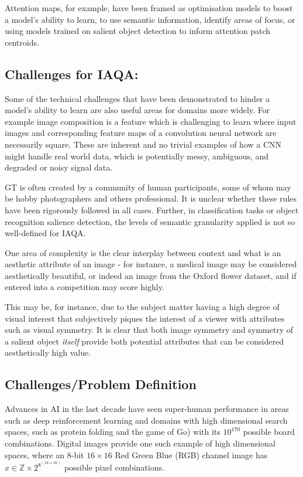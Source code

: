 \par Attention maps, for example, have been framed as optimisation models to boost a model's ability to learn, to use semantic information, identify areas of focus, or using models trained on salient object detection to inform attention patch centroids.

\subsection{Challenges for IAQA:}

Some of the technical challenges that have been demonstrated to hinder a model's ability to learn are also useful areas for domains more widely. For example image composition is a feature which is challenging to learn where input images and corresponding feature maps of a convolution neural network are necessarily square. These are inherent and no trivial examples of how a CNN might handle real world data, which is potentially messy, ambiguous, and degraded or noisy signal data.


GT is often created by a community of human participants, some of whom may be hobby photographers and others professional. It is unclear whether these rules have been rigorously followed in all cases. Further, in classification tasks or object recognition salience detection, the levels of semantic granularity applied is not so well-defined for IAQA. 

One area of complexity is the clear interplay between context and what is an aesthetic attribute of an image - for instance, a medical image may be considered aesthetically beautiful, or indeed an image from the Oxford flower dataset, and if entered into a competition may score highly. 

\par This may be, for instance, due to the subject matter having a high degree of visual interest that subjectively piques the interest of a viewer with attributes such as visual symmetry. It is clear that both image symmetry and symmetry of a salient object \textit{itself} provide both potential attributes that can be considered aesthetically high value.

\subsection{Challenges/Problem Definition}

Advances in AI in the last decade have seen super-human performance in areas such as deep reinforcement learning and domains with high dimensional search spaces, such as protein folding\cite{Senior2020} and the game of Go\cite{Silver2016}) with its $10^{170} $ possible board combinations. Digital images provide one such example of high dimensional spaces, where an 8-bit  $16 \times 16 $ Red Green Blue (RGB) channel image has $x \in \mathbb{Z} \times 2^{8^{(16 \times 16)}}$ possible pixel combinations.  

